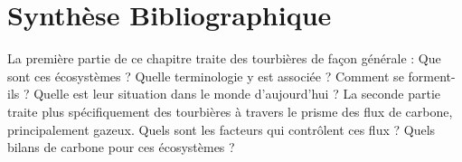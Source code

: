 
%	
%


\chapter{Synth\`{e}se Bibliographique}

\minitoc

\newpage

La première partie de ce chapitre traite des tourbières de façon générale : Que sont ces écosystèmes ?
Quelle terminologie y est associée ? Comment se forment-ils ? Quelle est leur situation dans le monde d'aujourd'hui ?
La seconde partie traite plus spécifiquement des tourbières à travers le prisme des flux de carbone, principalement gazeux.
Quels sont les facteurs qui contrôlent ces flux ? 
Quels bilans de carbone pour ces écosystèmes ?

